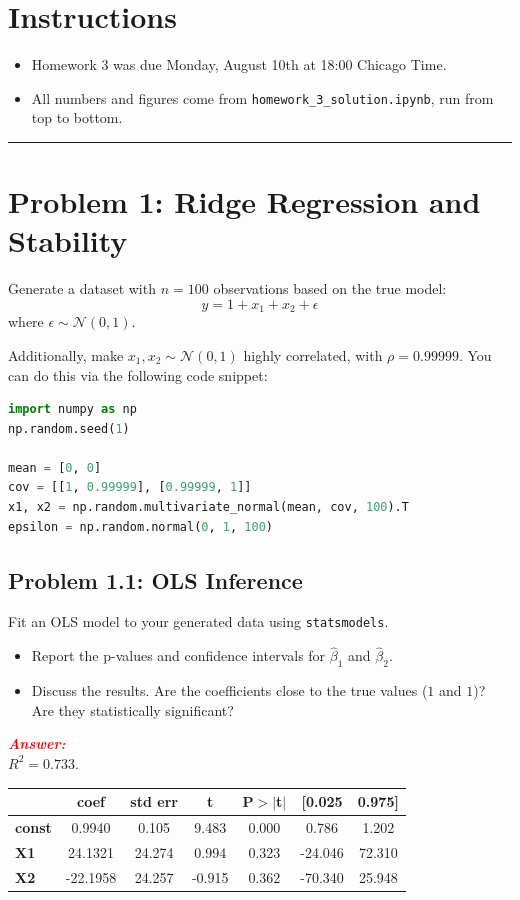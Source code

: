 \documentclass[11pt, letterpaper]{article}
\newcommand{\problem}[1]{\section*{Problem #1}}
\newcommand{\subproblem}[1]{\subsection*{Problem #1}}
\newcommand{\answer}{\textbf{\textit{\textcolor{red}{Answer:}}}\\}
\begin{document}
\section*{Instructions}
\begin{itemize}
    \item Homework 3 was due Monday, August 10th at 18:00 Chicago Time.
    \item All numbers and figures come from \texttt{homework\_3\_solution.ipynb}, run from top to bottom.
\end{itemize}
\hrule
\vspace{0.5cm}

\pagebreak

\problem{1: Ridge Regression and Stability}

Generate a dataset with $n=100$ observations based on the true model:
$$ y = 1 + x_1 + x_2 + \epsilon $$
where $\epsilon \sim \mathcal{N}(0, 1)$.

Additionally, make $x_1, x_2 \sim \mathcal{N}(0, 1)$ highly correlated, with $\rho = 0.99999$. You
can do this via the following code snippet:
    \begin{lstlisting}[language=Python]
import numpy as np
np.random.seed(1)

mean = [0, 0]
cov = [[1, 0.99999], [0.99999, 1]]
x1, x2 = np.random.multivariate_normal(mean, cov, 100).T
epsilon = np.random.normal(0, 1, 100)\end{lstlisting}
    


\subproblem{1.1: OLS Inference}
Fit an OLS model to your generated data using \texttt{statsmodels}.
\begin{itemize}
    \item Report the p-values and confidence intervals for $\hat{\beta}_1$ and $\hat{\beta}_2$.
    \item Discuss the results. Are the coefficients close to the true values ($1$ and $1$)? Are they statistically significant?
\end{itemize}

\answer
$R^2 = 0.733$.

\begin{center}
\begin{tabular}{lcccccc}
\toprule
               & \textbf{coef} & \textbf{std err} & \textbf{t} & \textbf{P$> |$t$|$} & \textbf{[0.025} & \textbf{0.975]}  \\
\midrule
\textbf{const} &       0.9940  &        0.105     &     9.483  &         0.000        &        0.786    &        1.202     \\
\textbf{X1}    &      24.1321  &       24.274     &     0.994  &         0.323        &      -24.046    &       72.310     \\
\textbf{X2}    &     -22.1958  &       24.257     &    -0.915  &         0.362        &      -70.340    &       25.948     \\
\bottomrule
\end{tabular}
\end{center}
\end{document}
